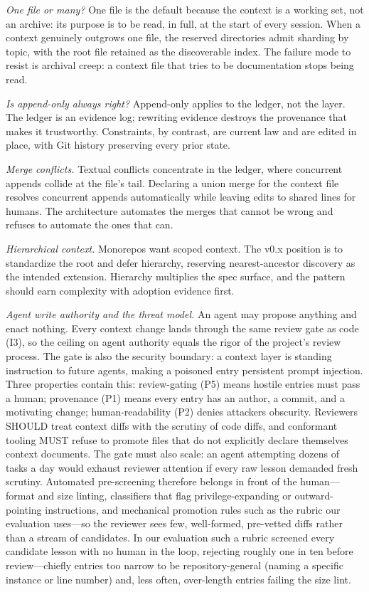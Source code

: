 \documentclass[sigconf,nonacm]{acmart}
\begin{document}
\emph{One file or many?} One file is the default because the context is a working
set, not an archive: its purpose is to be read, in full, at the start of every
session. When a context genuinely outgrows one file, the reserved directories
admit sharding by topic, with the root file retained as the discoverable index.
The failure mode to resist is archival creep: a context file that tries to be
documentation stops being read.

\emph{Is append-only always right?} Append-only applies to the ledger, not the
layer. The ledger is an evidence log; rewriting evidence destroys the provenance
that makes it trustworthy. Constraints, by contrast, are current law and are
edited in place, with Git history preserving every prior state.

\emph{Merge conflicts.} Textual conflicts concentrate in the ledger, where
concurrent appends collide at the file's tail. Declaring a union merge for the
context file resolves concurrent appends automatically while leaving edits to
shared lines for humans. The architecture automates the merges that cannot be
wrong and refuses to automate the ones that can.

\emph{Hierarchical context.} Monorepos want scoped context. The v0.x position is
to standardize the root and defer hierarchy, reserving nearest-ancestor discovery
as the intended extension. Hierarchy multiplies the spec surface, and the pattern
should earn complexity with adoption evidence first.

\emph{Agent write authority and the threat model.} An agent may propose anything
and enact nothing. Every context change lands through the same review gate as code
(I3), so the ceiling on agent authority equals the rigor of the project's review
process. The gate is also the security boundary: a context layer is standing
instruction to future agents, making a poisoned entry persistent prompt injection.
Three properties contain this: review-gating (P5) means hostile entries must pass a
human; provenance (P1) means every entry has an author, a commit, and a motivating
change; human-readability (P2) denies attackers obscurity. Reviewers SHOULD treat
context diffs with the scrutiny of code diffs, and conformant tooling MUST refuse
to promote files that do not explicitly declare themselves context documents. The
gate must also scale: an agent attempting dozens of tasks a day would exhaust
reviewer attention if every raw lesson demanded fresh scrutiny. Automated
pre-screening therefore belongs in front of the human---format and size linting,
classifiers that flag privilege-expanding or outward-pointing instructions, and
mechanical promotion rules such as the rubric our evaluation uses---so the reviewer
sees few, well-formed, pre-vetted diffs rather than a stream of candidates. In our
evaluation such a rubric screened every candidate lesson with no human in the loop,
rejecting roughly one in ten before review---chiefly entries too narrow to be
repository-general (naming a specific instance or line number) and, less often,
over-length entries failing the size lint.
\end{document}
